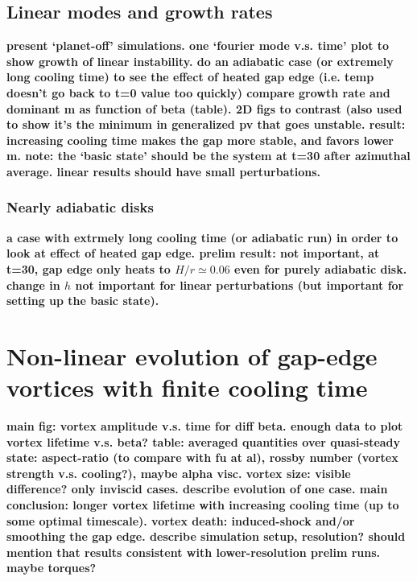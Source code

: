 \subsection{Linear modes and growth rates}
{\bf present `planet-off' simulations. one `fourier mode v.s. time'
  plot to show growth of linear instability. do an adiabatic case (or
  extremely long cooling time) to see the effect of heated gap edge
  (i.e. temp doesn't go back to t=0 value too quickly)
  compare growth rate and dominant
  m as function of beta (table). 2D figs to contrast (also used to
  show it's the minimum in generalized pv that goes unstable.    
  result: increasing cooling time makes the gap
  more stable, and favors lower m. note: the `basic state' should be
  the system at t=30 after azimuthal average. linear results should
  have small perturbations. 
}

\subsubsection{Nearly adiabatic disks}
{\bf a case with extrmely long cooling time (or adiabatic run) in
  order to look at effect of heated gap edge.  prelim result: not
  important, at t=30, gap edge only heats to $H/r\simeq0.06$ even for
  purely adiabatic disk. change in $h$ not important for linear
  perturbations (but important for setting up the basic state). 
}


\section{Non-linear evolution of
  gap-edge vortices with finite cooling time} 
{\bf main fig: vortex amplitude v.s. time for diff beta. enough data
  to plot vortex lifetime v.s. beta? table: 
  averaged quantities over quasi-steady state: aspect-ratio (to
  compare with fu at al), rossby number (vortex strength
  v.s. cooling?), maybe alpha visc. vortex size: visible difference?  
  only inviscid cases. describe evolution of one case. main
  conclusion: longer vortex lifetime with increasing cooling time (up
  to some optimal timescale). vortex death: induced-shock and/or
  smoothing the gap edge. describe simulation setup, resolution?
  should mention that results consistent with lower-resolution prelim
  runs. maybe torques? 
}


